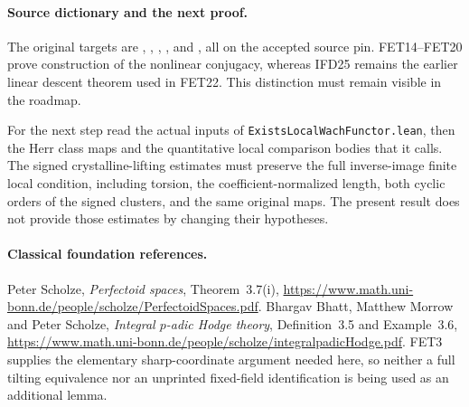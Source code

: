 \paragraph{Source dictionary and the next proof.}
The original targets are ,
, ,
, and
, all on the accepted source pin.
FET14--FET20 prove construction of the nonlinear conjugacy,
whereas IFD25 remains the earlier linear descent theorem used
in FET22. This distinction must remain visible in the roadmap.

For the next step read the actual inputs of
\texttt{ExistsLocalWachFunctor.lean}, then the Herr class maps
and the quantitative local comparison bodies that it calls.
The signed crystalline-lifting estimates must preserve the
full inverse-image finite local condition, including torsion,
the coefficient-normalized length, both cyclic orders of the
signed clusters, and the same original maps. The present result
does not provide those estimates by changing their hypotheses.

\paragraph{Classical foundation references.}
Peter Scholze, \emph{Perfectoid spaces}, Theorem~3.7(i),
\url{https://www.math.uni-bonn.de/people/scholze/PerfectoidSpaces.pdf}.
Bhargav Bhatt, Matthew Morrow and Peter Scholze,
\emph{Integral $p$-adic Hodge theory}, Definition~3.5 and
Example~3.6,
\url{https://www.math.uni-bonn.de/people/scholze/integralpadicHodge.pdf}.
FET3 supplies the elementary sharp-coordinate argument needed
here, so neither a full tilting equivalence nor an unprinted
fixed-field identification is being used as an additional lemma.
